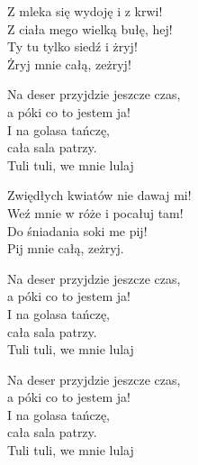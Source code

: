 \begin{text}
    Z mleka się wydoję i z krwi!\\
    Z ciała mego wielką bułę, hej!\\
    Ty tu tylko siedź i żryj!\\
    Żryj mnie całą, zeżryj!

    Na deser przyjdzie jeszcze czas,\\
    a póki co to jestem ja!\\
    I na golasa tańczę,\\
    cała sala patrzy.\\
    Tuli tuli, we mnie lulaj

    Zwiędłych kwiatów nie dawaj mi!\\
    Weź mnie w róże i pocałuj tam!\\
    Do śniadania soki me pij!\\
    Pij mnie całą, zeżryj.

    Na deser przyjdzie jeszcze czas,\\
    a póki co to jestem ja!\\
    I na golasa tańczę,\\
    cała sala patrzy.\\
    Tuli tuli, we mnie lulaj

    Na deser przyjdzie jeszcze czas,\\
    a póki co to jestem ja!\\
    I na golasa tańczę,\\
    cała sala patrzy.\\
    Tuli tuli, we mnie lulaj
\end{text}
\begin{chord}

\end{chord}